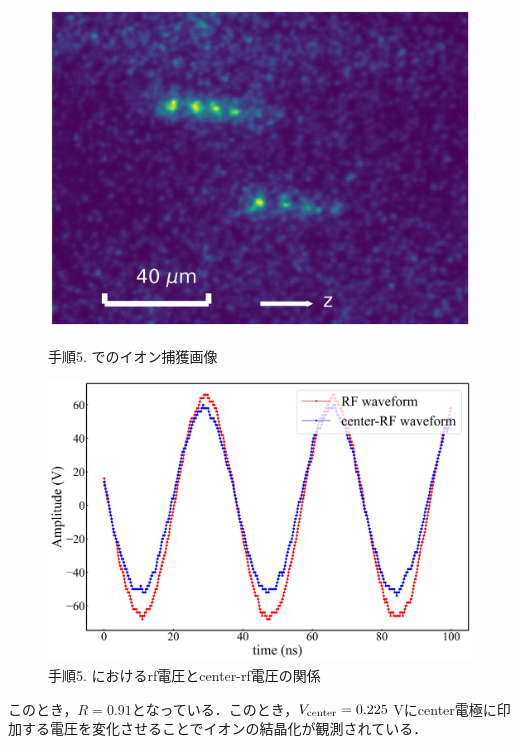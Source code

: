 \begin{enumerate}
\begin{figure}[h]
	\begin{minipage}{0.48\linewidth}
	\begin{center}
		\includegraphics[width = 0.6\columnwidth]{./methods/figure/5_2D.jpg}
		\caption{手順5. でのイオン捕獲画像}
		\label{fig:5_2D}
	\end{center}
	\end{minipage}
	\begin{minipage}{0.48\linewidth}
		\begin{center}
			\includegraphics[width = 0.9\columnwidth]{./methods/figure/5_2D_wave.jpg}
			\caption{手順5. におけるrf電圧とcenter-rf電圧の関係}
			\label{fig:5_2D_wave}
		\end{center}
	\end{minipage}
\end{figure}

このとき，$R=0.91$となっている．このとき，$V_{\rm center} = 0.225$ Vにcenter電極に印加する電圧を変化させることでイオンの結晶化が観測されている．

\end{enumerate}

\clearpage

